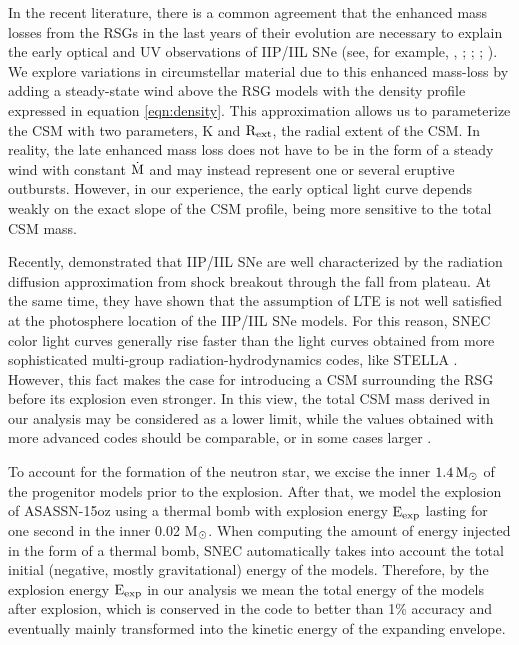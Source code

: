 \documentclass[a4paper,fleqn,usenatbib]{mnras}
\newcommand{\msunperiod}{M$\rm{_{\odot}}$}
\begin{document}
In the recent literature, there is a common agreement that the enhanced mass losses from the RSGs in the last years of their evolution are necessary to explain the early optical and UV observations of IIP/IIL SNe (see, for example, \citealt{2018morozova}, \citealt{2015gezari}; \citealt{2017yaron}; \citealt{2018bullivant}; \citealt{2018foerster}). 
We explore variations in circumstellar material due to this enhanced mass-loss by adding a steady-state wind above the RSG models with the density profile expressed in equation \ref{eqn:density}.
This approximation allows us to parameterize the CSM with two parameters, K and $\rm{R_{ext}}$, the radial extent of the CSM.
In reality, the late enhanced mass loss does not have to be in the form of a steady wind with constant $\rm{\dot{M}}$ and may instead represent one or several eruptive outbursts. However, in our experience, the early optical light curve depends weakly on the exact slope of the CSM profile, being more sensitive to the total CSM mass.

Recently, \citet{2018paxton} demonstrated that IIP/IIL SNe are well characterized by the radiation diffusion approximation from shock breakout through the fall from plateau.
At the same time, they have shown that the assumption of LTE is not well satisfied at the photosphere location of the IIP/IIL SNe models. 
For this reason, SNEC color light curves generally rise faster than the light curves obtained from more sophisticated multi-group radiation-hydrodynamics codes, like STELLA \citep{2018paxton}. 
However, this fact makes the case for introducing a CSM surrounding the RSG before its explosion even stronger.
In this view, the total CSM mass derived in our analysis may be considered as a lower limit, while the values obtained with more advanced codes should be comparable, or in some cases larger \citep{2017moriya,2018paxton}.

To account for the formation of the neutron star, we excise the inner $\rm{1.4\,M_{\odot}}$ of the progenitor models prior to the explosion. 
After that, we model the explosion of ASASSN-15oz using a thermal bomb with explosion energy $\rm{E_{exp}}$ lasting for one second in the inner 0.02 \msunperiod. 
When computing the amount of energy injected in the form of a thermal bomb, SNEC automatically takes into account the total initial (negative, mostly gravitational) energy of the models. 
Therefore, by the explosion energy $\rm{E_{exp}}$ in our analysis we mean the total energy of the models after explosion, which is conserved in the code to better than 1\% accuracy and eventually mainly transformed into the kinetic energy of the expanding envelope.
\end{document}
